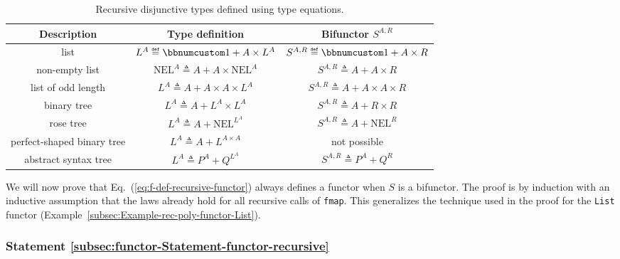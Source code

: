\begin{table}
\begin{centering}
\begin{tabular}{|c|c|c|}
\hline 
\textbf{\small{}Description} & \textbf{\small{}Type definition} & \textbf{\small{}Bifunctor $S^{A,R}$}\tabularnewline
\hline 
\hline 
{\small{}list} & {\small{}$L^{A}\triangleq\bbnum 1+A\times L^{A}$} & {\small{}$S^{A,R}\triangleq\bbnum 1+A\times R$}\tabularnewline
\hline 
{\small{}non-empty list} & {\small{}$\text{NEL}^{A}\triangleq A+A\times\text{NEL}^{A}$} & {\small{}$S^{A,R}\triangleq A+A\times R$}\tabularnewline
\hline 
{\small{}list of odd length} & {\small{}$L^{A}\triangleq A+A\times A\times L^{A}$} & {\small{}$S^{A,R}\triangleq A+A\times A\times R$}\tabularnewline
\hline 
{\small{}binary tree} & {\small{}$L^{A}\triangleq A+L^{A}\times L^{A}$} & {\small{}$S^{A,R}\triangleq A+R\times R$}\tabularnewline
\hline 
{\small{}rose tree} & {\small{}$L^{A}\triangleq A+\text{NEL}^{L^{A}}$} & {\small{}$S^{A,R}\triangleq A+\text{NEL}^{R}$}\tabularnewline
\hline 
{\small{}perfect-shaped binary tree} & {\small{}$L^{A}\triangleq A+L^{A\times A}$} & {\small{}not possible}\tabularnewline
\hline 
{\small{}abstract syntax tree} & {\small{}$L^{A}\triangleq P^{A}+Q^{L^{A}}$} & {\small{}$S^{A,R}\triangleq P^{A}+Q^{R}$}\tabularnewline
\hline 
\end{tabular}
\par\end{centering}
\caption{Recursive disjunctive types defined using type equations.\label{tab:Examples-of-recursive-disjunctive-type-equations}}
\end{table}

We will now prove that Eq.~(\ref{eq:f-def-recursive-functor}) always
defines a functor when $S$ is a bifunctor. The proof is by induction
with an inductive assumption that the laws already hold for all recursive
calls of \lstinline!fmap!. This generalizes the technique used in
the proof for the \lstinline!List! functor (Example~\ref{subsec:Example-rec-poly-functor-List}).

\subsubsection{Statement \label{subsec:functor-Statement-functor-recursive}\ref{subsec:functor-Statement-functor-recursive}}

